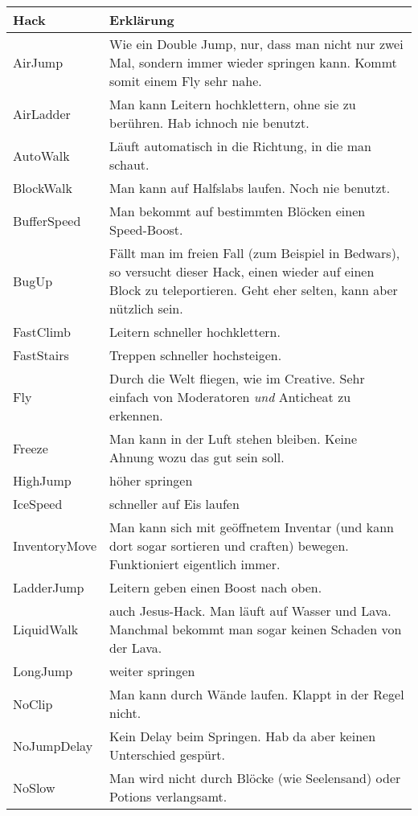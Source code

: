 \begin{longtable}{p{3cm}|p{10cm}}
\textbf{Hack} & \textbf{Erklärung} \\
\hline
AirJump & Wie ein Double Jump, nur, dass man nicht nur zwei Mal, sondern immer wieder springen kann. Kommt somit einem Fly sehr nahe. \\
\hline
AirLadder & Man kann Leitern hochklettern, ohne sie zu berühren. Hab ichnoch nie benutzt. \\
\hline
AutoWalk & Läuft automatisch in die Richtung, in die man schaut. \\
\hline
BlockWalk & Man kann auf Halfslabs laufen. Noch nie benutzt. \\
\hline
BufferSpeed & Man bekommt auf bestimmten Blöcken einen Speed-Boost. \\
\hline
BugUp & Fällt man im freien Fall (zum Beispiel in Bedwars), so versucht dieser Hack, einen wieder auf einen Block zu teleportieren. Geht eher selten, kann aber nützlich sein. \\
\hline
FastClimb & Leitern schneller hochklettern. \\
\hline
FastStairs & Treppen schneller hochsteigen. \\
\hline
\rowcolor{lime!50}Fly & Durch die Welt fliegen, wie im Creative. Sehr einfach von Moderatoren \textit{und} Anticheat zu erkennen. \\
\hline
Freeze & Man kann in der Luft stehen bleiben. Keine Ahnung wozu das gut sein soll. \\
\hline
HighJump & höher springen \\
\hline
IceSpeed & schneller auf Eis laufen \\
\hline
\rowcolor{lime!50}InventoryMove & Man kann sich mit geöffnetem Inventar (und kann dort sogar sortieren und craften) bewegen. Funktioniert eigentlich immer. \\
\hline
LadderJump & Leitern geben einen Boost nach oben. \\
\hline
LiquidWalk & auch Jesus-Hack. Man läuft auf Wasser und Lava. Manchmal bekommt man sogar keinen Schaden von der Lava. \\
\hline
LongJump & weiter springen \\
\hline
NoClip & Man kann durch Wände laufen. Klappt in der Regel nicht. \\
\hline
NoJumpDelay & Kein Delay beim Springen. Hab da aber keinen Unterschied gespürt. \\
\hline
\rowcolor{lime!50}NoSlow & Man wird nicht durch Blöcke (wie Seelensand) oder Potions verlangsamt. \\

\end{longtable}
